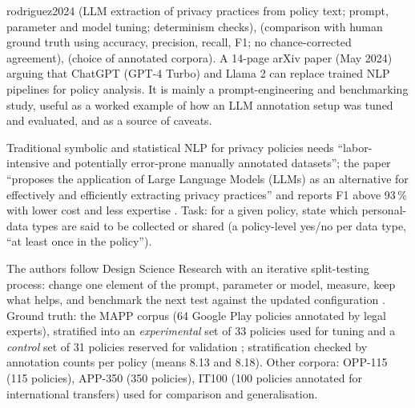\begin{papercard}{rodriguez2024}
  (LLM extraction of privacy practices from policy text; prompt, parameter and model tuning; determinism checks),  (comparison with human ground truth using accuracy, precision, recall, F1; no chance-corrected agreement),  (choice of annotated corpora). A 14-page arXiv paper (May 2024) arguing that ChatGPT (GPT-4 Turbo) and Llama 2 can replace trained NLP pipelines for policy analysis. It is mainly a prompt-engineering and benchmarking study, useful as a worked example of how an LLM annotation setup was tuned and evaluated, and as a source of caveats.

 Traditional symbolic and statistical NLP for privacy policies needs ``labor-intensive and potentially error-prone manually annotated datasets''; the paper ``proposes the application of Large Language Models (LLMs) as an alternative for effectively and efficiently extracting privacy practices'' and reports F1 above 93\,\% with lower cost and less expertise . Task: for a given policy, state which personal-data types are said to be collected or shared (a policy-level yes/no per data type, ``at least once in the policy'').

 The authors follow Design Science Research with an iterative split-testing process: change one element of the prompt, parameter or model, measure, keep what helps, and benchmark the next test against the updated configuration . Ground truth: the MAPP corpus (64 Google Play policies annotated by legal experts), stratified into an \emph{experimental} set of 33 policies used for tuning and a \emph{control} set of 31 policies reserved for validation ; stratification checked by annotation counts per policy (means 8.13 and 8.18). Other corpora: OPP-115 (115 policies), APP-350 (350 policies), IT100 (100 policies annotated for international transfers) used for comparison and generalisation.


\end{papercard}
